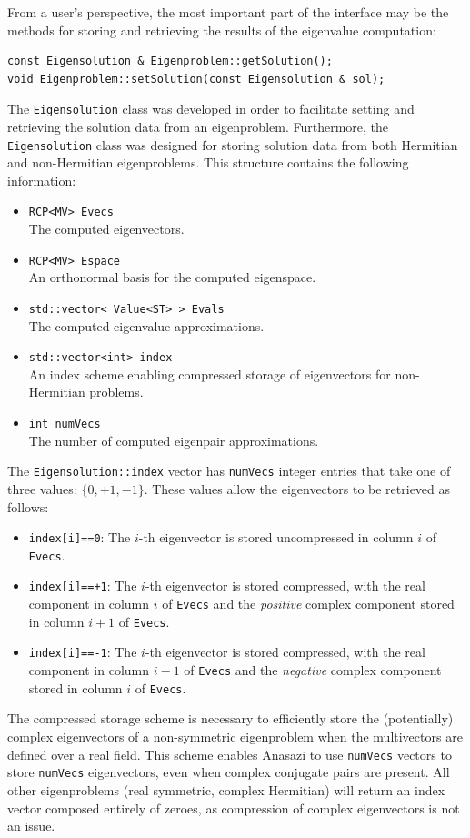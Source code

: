 \documentclass[acmtoms,acmnow]{acmtrans2m}
\newcommand{\aspace}[1]{\texttt{#1}}
\begin{document}
From a user's perspective, the most important part of the interface may be the methods 
for storing and retrieving the results of the eigenvalue computation:
\begin{verbatim}
const Eigensolution & Eigenproblem::getSolution();
void Eigenproblem::setSolution(const Eigensolution & sol);
\end{verbatim}
The \aspace{Eigensolution} class was developed in order to
facilitate setting and retrieving the solution data from an eigenproblem.  
Furthermore, the \aspace{Eigensolution} class was designed for storing
solution data from both Hermitian and non-Hermitian eigenproblems. 
This structure contains the following information:
\begin{itemize}
  \item \verb!RCP<MV> Evecs! \\
   The computed eigenvectors.
 \item \verb!RCP<MV> Espace! \\
   An orthonormal basis for the computed eigenspace.
 \item \verb!std::vector< Value<ST> > Evals! \\
   The computed eigenvalue approximations.
 \item \verb!std::vector<int> index! \\
   An index scheme enabling compressed storage of eigenvectors for non-Hermitian problems.
 \item \verb!int numVecs! \\
   The number of computed eigenpair approximations.
\end{itemize}
The \aspace{Eigensolution::index} vector has \aspace{numVecs} integer entries that take 
one of three values: $\{0, +1, -1\}$. These values allow the eigenvectors to be retrieved as follows:
\begin{itemize}
  \item \aspace{index[i]==0}: The $i$-th eigenvector is stored uncompressed in column $i$ of
    \verb!Evecs!.
  \item \aspace{index[i]==+1}: The $i$-th eigenvector is stored compressed, with the real
    component in column $i$ of \verb!Evecs! and the \emph{positive} complex component
    stored in column $i+1$ of \verb!Evecs!.
  \item \aspace{index[i]==-1}: The $i$-th eigenvector is stored compressed, with the real
    component in column $i-1$ of \verb!Evecs! and the \emph{negative} complex component
    stored in column $i$ of \verb!Evecs!.
\end{itemize}
The compressed storage scheme is necessary to efficiently store the (potentially) complex
eigenvectors of a non-symmetric eigenproblem when the multivectors are defined over a real
field. This scheme enables Anasazi to use \aspace{numVecs} vectors to store
\aspace{numVecs} eigenvectors, even when complex conjugate pairs are present. All other
eigenproblems (real symmetric, complex Hermitian) will return an index vector composed
entirely of zeroes, as compression of complex eigenvectors is not an issue.
\end{document}
